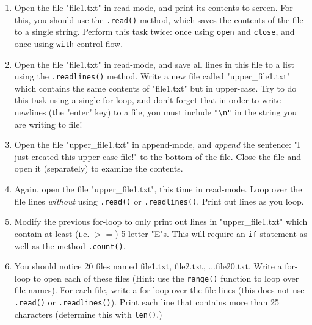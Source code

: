 \documentclass{article}[12pt]
\newcommand{\code}[1]{\texttt{#1}}  %
\begin{document}
\begin{enumerate}
	
	\item Open the file "file1.txt" in read-mode, and print its contents to screen. For this, you should use the \code{.read()} method, which saves the contents of the file to a single string. Perform this task twice: once using \code{open} and \code{close}, and once using \code{with} control-flow.
	
	\item Open the file "file1.txt" in read-mode, and save all lines in this file to a list using the \code{.readlines()} method. Write a new file called "upper\_file1.txt" which contains the same contents of "file1.txt" but in upper-case. Try to do this task using a single for-loop, and don't forget that in order to write newlines (the "enter" key) to a file, you must include \code{"\textbackslash n"} in the string you are writing to file!
	
	\item Open the file "upper\_file1.txt" in append-mode, and \emph{append} the sentence: "I just created this upper-case file!" to the bottom of the file. Close the file and open it (separately) to examine the contents. 
	
	\item Again, open the file "upper\_file1.txt", this time in read-mode. Loop over the file lines \emph{without} using \code{.read()} or \code{.readlines()}. Print out lines as you loop.
	
	\item Modify the previous for-loop to only print out lines in "upper\_file1.txt" which contain at least (i.e. $>=$) 5 letter "E"s. This will require an \code{if} statement as well as the method \code{.count()}.
	
	\item You should notice 20 files named file1.txt, file2.txt, ...file20.txt. Write a for-loop to open each of these files (Hint: use the \code{range()} function to loop over file names). For each file, write a for-loop over the file lines (this does not use \code{.read()} or \code{.readlines()}). Print each line that contains more than 25 characters (determine this with \code{len()}.)
\end{enumerate}
\end{document}
